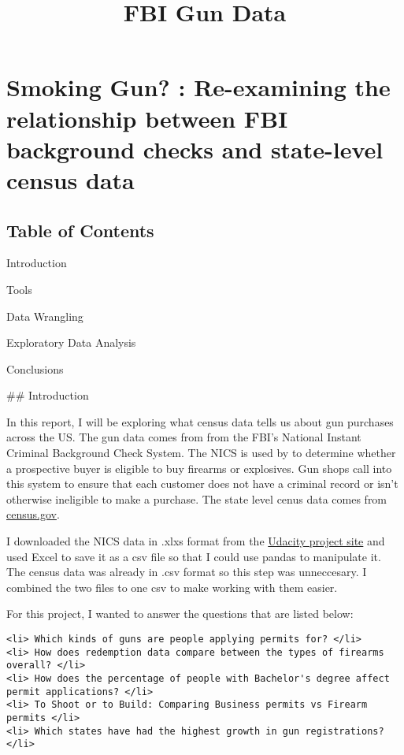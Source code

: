 \documentclass[11pt]{article}
\title{FBI Gun Data}
\begin{document}
    
    
    \maketitle
    
    

    
    \section{Smoking Gun? : Re-examining the relationship between FBI
background checks and state-level census
data}\label{smoking-gun-re-examining-the-relationship-between-fbi-background-checks-and-state-level-census-data}

\subsection{Table of Contents}\label{table-of-contents}

Introduction

Tools

Data Wrangling

Exploratory Data Analysis

Conclusions

     \#\# Introduction

In this report, I will be exploring what census data tells us about gun
purchases across the US. The gun data comes from from the FBI's National
Instant Criminal Background Check System. The NICS is used by to
determine whether a prospective buyer is eligible to buy firearms or
explosives. Gun shops call into this system to ensure that each customer
does not have a criminal record or isn't otherwise ineligible to make a
purchase. The state level cenus data comes from
\href{https://www.census.gov}{census.gov}.

I downloaded the NICS data in .xlxs format from the
\href{https://docs.google.com/document/d/e/2PACX-1vTlVmknRRnfy_4eTrjw5hYGaiQim5ctr9naaRd4V9du2B5bxpd8FEH3KtDgp8qVekw7Cj1GLk1IXdZi/pub?embedded=True}{Udacity
project site} and used Excel to save it as a csv file so that I could
use pandas to manipulate it. The census data was already in .csv format
so this step was unneccesary. I combined the two files to one csv to
make working with them easier.

For this project, I wanted to answer the questions that are listed
below:

\begin{verbatim}
<li> Which kinds of guns are people applying permits for? </li>
<li> How does redemption data compare between the types of firearms overall? </li>
<li> How does the percentage of people with Bachelor's degree affect permit applications? </li>
<li> To Shoot or to Build: Comparing Business permits vs Firearm permits </li>
<li> Which states have had the highest growth in gun registrations? </li>
\end{verbatim}
\end{document}
